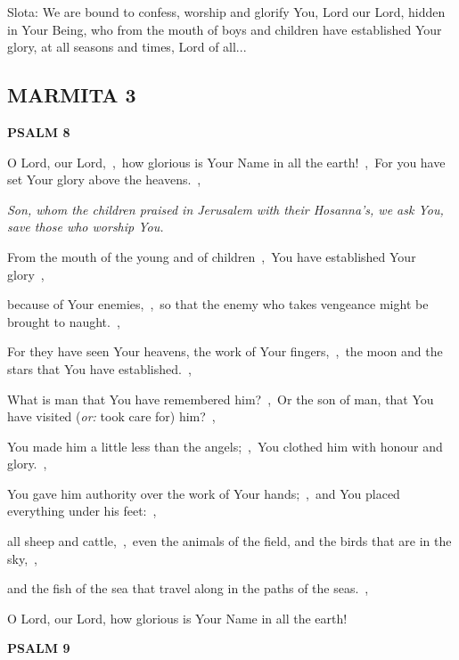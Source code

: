 \documentclass[12pt,twoside,a5paper]{article}
\newcommand{\marmita}[1]{\subsection*{MARMITA {#1}}}
\newcommand{\psalm}[1]{\textbf{PSALM {#1}}}
\newcommand{\qanona}[1]{{\liturgicalhint{Qanona.} \emph{#1}}}
\newcommand{\slota}[1]{\liturgicalhint{Slota.} #1}
\newcommand{\translationoption}[1]{\emph{or:} #1}
\begin{document}
\slota{Slota: We are bound to confess, worship and glorify You, Lord our Lord, hidden in Your Being, who from the mouth of boys and children have established Your glory, at all seasons and times, Lord of all...}

\marmita{3}

\psalm{8}

\begin{normalparskip}
  O Lord, our Lord,~\sep\ how glorious is Your Name in all the earth!~\sep\ For you have set Your glory above the heavens.~\sep

  \qanona{Son, whom the children praised in Jerusalem with their Hosanna's, we ask You, save those who worship You.}

  From the mouth of the young and of children~\sep\ You have established Your glory~\sep

  because of Your enemies,~\sep\ so that the enemy who takes vengeance might be brought to naught.~\sep

  For they have seen Your heavens, the work of Your fingers,~\sep\ the moon and the stars that You have established.~\sep

  What is man that You have remembered him?~\sep\ Or the son of man, that You have visited (\translationoption{took care for}) him?~\sep

  You made him a little less than the angels;~\sep\ You clothed him with honour and glory.~\sep

  You gave him authority over the work of Your hands;~\sep\ and You placed everything under his feet:~\sep

  all sheep and cattle,~\sep\ even the animals of the field, and the birds that are in the sky,~\sep

  and the fish of the sea that travel along in the paths of the seas.~\sep

  O Lord, our Lord, how glorious is Your Name in all the earth!
\end{normalparskip}

\psalm{9}
\end{document}
